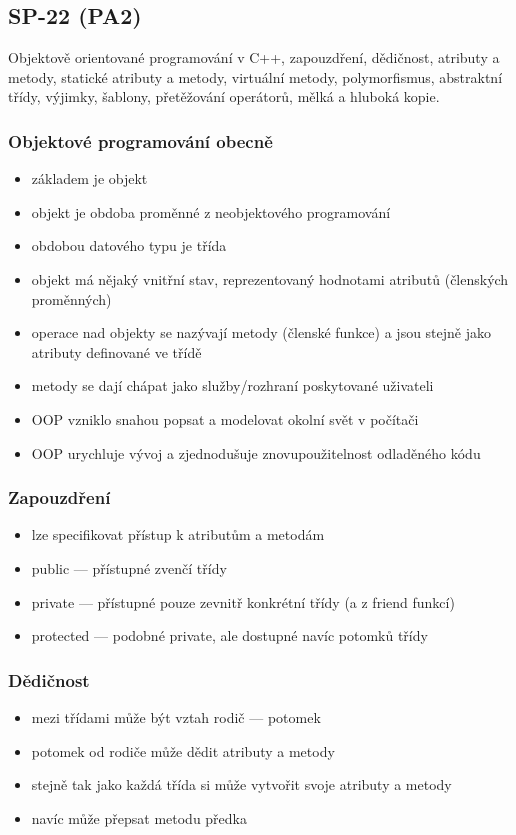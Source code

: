 \subsection{SP-22 (PA2)}
Objektově orientované programování v C++, zapouzdření, dědičnost, atributy a metody, statické atributy a metody, virtuální metody, polymorfismus, abstraktní třídy, výjimky, šablony, přetěžování operátorů, mělká a hluboká kopie.

\subsubsection*{Objektové programování obecně}
\begin{itemize}
	\item základem je objekt
	\item objekt je obdoba proměnné z neobjektového programování
	\item obdobou datového typu je třída
	\item objekt má nějaký vnitřní stav, reprezentovaný hodnotami atributů (členských proměnných)
	\item operace nad objekty se nazývají metody (členské funkce) a jsou stejně jako atributy definované ve třídě
	\item metody se dají chápat jako služby/rozhraní poskytované uživateli 
	\item OOP vzniklo snahou popsat a modelovat okolní svět v počítači
	\item OOP urychluje vývoj a zjednodušuje znovupoužitelnost odladěného kódu
\end{itemize}

\subsubsection*{Zapouzdření}
\begin{itemize}
	\item lze specifikovat přístup k atributům a metodám
	\item public --- přístupné zvenčí třídy
	\item private --- přístupné pouze zevnitř konkrétní třídy (a z friend funkcí)
	\item protected --- podobné private, ale dostupné navíc potomků třídy
\end{itemize}

\subsubsection*{Dědičnost}
\begin{itemize}
	\item mezi třídami může být vztah rodič --- potomek
	\item potomek od rodiče může dědit atributy a metody
	\item stejně tak jako každá třída si může vytvořit svoje atributy a metody
	\item navíc může přepsat metodu předka
\end{itemize}

